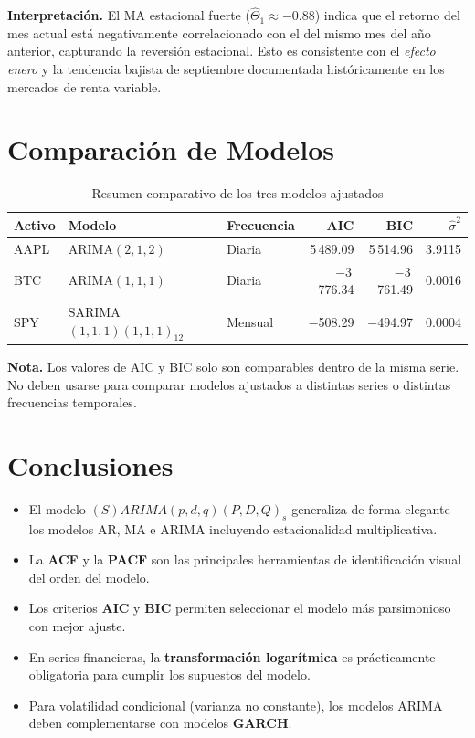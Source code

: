 \documentclass[12pt,a4paper]{article}
\begin{document}
\textbf{Interpretación.} El MA estacional fuerte ($\hat{\Theta}_1 \approx -0.88$) indica
que el retorno del mes actual está negativamente correlacionado con el del mismo mes del
año anterior, capturando la reversión estacional. Esto es consistente con el
\emph{efecto enero} y la tendencia bajista de septiembre documentada históricamente
en los mercados de renta variable.

\section{Comparación de Modelos}

\begin{table}[H]
\centering
\caption{Resumen comparativo de los tres modelos ajustados}
\begin{tabular}{lllrrr}
\toprule
\textbf{Activo} & \textbf{Modelo} & \textbf{Frecuencia}
  & \textbf{AIC} & \textbf{BIC} & $\hat{\sigma}^2$ \\
\midrule
AAPL & ARIMA$(2,1,2)$                    & Diaria   &  5\,489.09  &  5\,514.96  & 3.9115 \\
BTC  & ARIMA$(1,1,1)$                    & Diaria   & $-$3\,776.34 & $-$3\,761.49 & 0.0016 \\
SPY  & SARIMA$(1,1,1)(1,1,1)_{12}$       & Mensual  & $-$508.29   & $-$494.97   & 0.0004 \\
\bottomrule
\end{tabular}
\end{table}

\noindent\textbf{Nota.} Los valores de AIC y BIC solo son comparables dentro de la
misma serie. No deben usarse para comparar modelos ajustados a distintas series o
distintas frecuencias temporales.

\section{Conclusiones}

\begin{itemize}
  \item El modelo $(S)ARIMA(p,d,q)(P,D,Q)_s$ generaliza de forma elegante los modelos
        AR, MA e ARIMA incluyendo estacionalidad multiplicativa.
  \item La \textbf{ACF} y la \textbf{PACF} son las principales herramientas de
        identificación visual del orden del modelo.
  \item Los criterios \textbf{AIC} y \textbf{BIC} permiten seleccionar el modelo más
        parsimonioso con mejor ajuste.
  \item En series financieras, la \textbf{transformación logarítmica} es prácticamente
        obligatoria para cumplir los supuestos del modelo.
  \item Para volatilidad condicional (varianza no constante), los modelos ARIMA deben
        complementarse con modelos \textbf{GARCH}.
\end{itemize}
\end{document}
